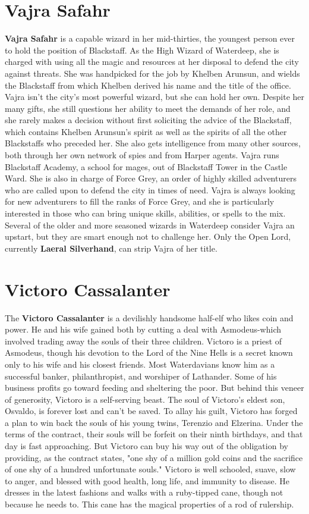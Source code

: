\documentclass[10pt,a4paper,twoside,twocolumn,openany,nodeprecatedcode]{dndbook}
\begin{document}
\section{Vajra Safahr}
\textbf{Vajra Safahr} is a capable wizard in her mid-thirties, the youngest person ever to hold the position of Blackstaff. As the High Wizard of Waterdeep, she is charged with using all the magic and resources at her disposal to defend the city against threats. She was handpicked for the job by Khelben Arunsun, and wields the Blackstaff from which Khelben derived his name and the title of the office. Vajra isn't the city's most powerful wizard, but she can hold her own. Despite her many gifts, she still questions her ability to meet the demands of her role, and she rarely makes a decision without first soliciting the advice of the Blackstaff, which contains Khelben Arunsun's spirit as well as the spirits of all the other Blackstaffs who preceded her. She also gets intelligence from many other sources, both through her own network of spies and from Harper agents.
Vajra runs Blackstaff Academy, a school for mages, out of Blackstaff Tower in the Castle Ward. She is also in charge of Force Grey, an order of highly skilled adventurers who are called upon to defend the city in times of need.
Vajra is always looking for new adventurers to fill the ranks of Force Grey, and she is particularly interested in those who can bring unique skills, abilities, or spells to the mix.
Several of the older and more seasoned wizards in Waterdeep consider Vajra an upstart, but they are smart enough not to challenge her. Only the Open Lord, currently \textbf{Laeral Silverhand}, can strip Vajra of her title.
\section{Victoro Cassalanter}
The \textbf{Victoro Cassalanter} is a devilishly handsome half-elf who likes coin and power. He and his wife gained both by cutting a deal with Asmodeus-which involved trading away the souls of their three children.
Victoro is a priest of Asmodeus, though his devotion to the Lord of the Nine Hells is a secret known only to his wife and his closest friends. Most Waterdavians know him as a successful banker, philanthropist, and worshiper of Lathander. Some of his business profits go toward feeding and sheltering the poor. But behind this veneer of generosity, Victoro is a self-serving beast.
The soul of Victoro's eldest son, Osvaldo, is forever lost and can't be saved. To allay his guilt, Victoro has forged a plan to win back the souls of his young twins, Terenzio and Elzerina. Under the terms of the contract, their souls will be forfeit on their ninth birthdays, and that day is fast approaching. But Victoro can buy his way out of the obligation by providing, as the contract states, "one shy of a million gold coins and the sacrifice of one shy of a hundred unfortunate souls."
Victoro is well schooled, suave, slow to anger, and blessed with good health, long life, and immunity to disease. He dresses in the latest fashions and walks with a ruby-tipped cane, though not because he needs to. This cane has the magical properties of a rod of rulership.
\end{document}
